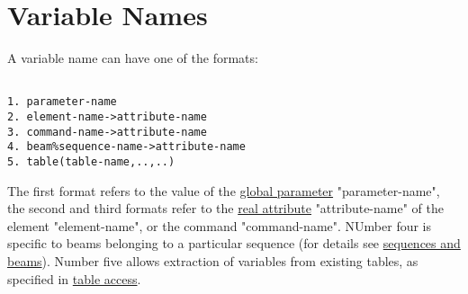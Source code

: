 
\section{Variable Names}

A variable name can have one of the formats: 
\begin{verbatim}

1. parameter-name
2. element-name->attribute-name
3. command-name->attribute-name
4. beam%sequence-name->attribute-name
5. table(table-name,..,..)
\end{verbatim} 

The first format refers to the value of the \href{parameter.html}{global
  parameter} "parameter-name", the second and third formats refer to the
\href{real.html}{real attribute} "attribute-name" of the element
"element-name", or the command "command-name". NUmber four is specific
to beams belonging to a particular sequence (for details see
\href{sequence.html#beam}{sequences and beams}). Number five allows
extraction of variables from existing tables, as specified in
\href{expression.html#table}{table access}.  

